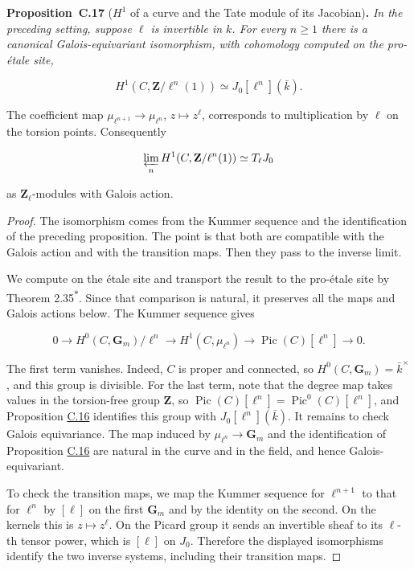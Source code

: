 \documentclass[11pt]{article}
\newenvironment{bpstatement}[2]{\par\addvspace{0.6\baselineskip}\noindent\textbf{#1}#2\textbf{.}\enspace\ignorespaces}
  {\par\addvspace{0.4\baselineskip}}
\newenvironment{bpstatementit}[2]{\begin{bpstatement}{#1}{#2}\itshape\ignorespaces}{\end{bpstatement}}
\newcommand{\bpout}[1]{#1\textsuperscript{\hyperlink{bp-outside}{\ensuremath{\ast}}}}
\begin{document}
\label{bp170}%
\begin{bpstatementit}{Proposition~C.17}{ ($H^1$ of a curve and the Tate module of its Jacobian)}
In the preceding setting, suppose \(\ell\) is invertible in \(k\). For every \(n\geq1\) there is a canonical Galois-equivariant isomorphism, with cohomology computed on the pro-étale site,

\[
H^1(C,\mathbf Z/\ell^n(1))
\simeq J_0[\ell^n](\bar k).
\]

The coefficient map \(\mu_{\ell^{n+1}}\to\mu_{\ell^n}\), \(z\mapsto z^\ell\), corresponds to multiplication by \(\ell\) on the torsion points. Consequently

\[
\varprojlim_n H^1(C,\mathbf Z/\ell^n(1))\simeq T_\ell J_0
\]

as \(\mathbf Z_\ell\)-modules with Galois action.
\end{bpstatementit}

\begin{proof}[{Proof}]\label{bp171}%
The isomorphism comes from the Kummer sequence and the identification of the preceding proposition. The point is that both are compatible with the Galois action and with the transition maps. Then they pass to the inverse limit.

We compute on the étale site and transport the result to the pro-étale site by Theorem \bpout{2.35}. Since that comparison is natural, it preserves all the maps and Galois actions below. The Kummer sequence gives

\[
0\longrightarrow
H^0(C,\mathbf G_m)/\ell^n
\longrightarrow H^1(C,\mu_{\ell^n})
\longrightarrow\operatorname{Pic}(C)[\ell^n]
\longrightarrow0.
\]

The first term vanishes. Indeed, \(C\) is proper and connected, so \(H^0(C,\mathbf G_m)=\bar k^{\times}\), and this group is divisible. For the last term, note that the degree map takes values in the torsion-free group \(\mathbf Z\), so \(\operatorname{Pic}(C)[\ell^n]=\operatorname{Pic}^0(C)[\ell^n]\), and Proposition \hyperref[bp167]{C.16} identifies this group with \(J_0[\ell^n](\bar k)\). It remains to check Galois equivariance. The map induced by \(\mu_{\ell^n}\to\mathbf G_m\) and the identification of Proposition \hyperref[bp167]{C.16} are natural in the curve and in the field, and hence Galois-equivariant.

To check the transition maps, we map the Kummer sequence for \(\ell^{n+1}\) to that for \(\ell^n\) by \([\ell]\) on the first \(\mathbf G_m\) and by the identity on the second. On the kernels this is \(z\mapsto z^\ell\). On the Picard group it sends an invertible sheaf to its \(\ell\)-th tensor power, which is \([\ell]\) on \(J_0\). Therefore the displayed isomorphisms identify the two inverse systems, including their transition maps.
\end{proof}
\end{document}
